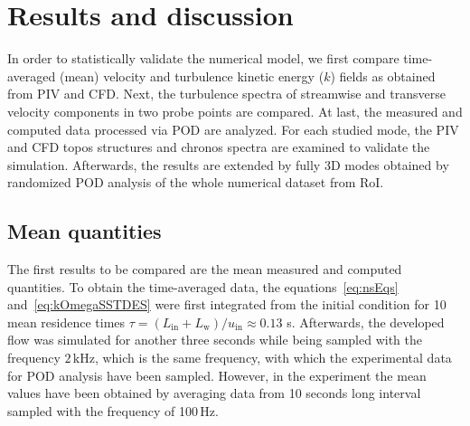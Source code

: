 \section{Results and discussion}
\label{sec:resultsAndDisc}

{In order to statistically validate the numerical model, we first compare time-averaged (mean) velocity and turbulence kinetic energy ($k$) fields as obtained from PIV and CFD.} Next, the turbulence spectra of streamwise and {transverse} velocity components in two probe points are compared. At last, the measured and computed data {processed via POD} are analyzed. For each studied mode, the PIV and CFD topos structures and chronos spectra are examined to validate the simulation. {Afterwards, } the results are extended by fully 3D modes obtained by {randomized} POD analysis of the whole numerical dataset from RoI.

\subsection{Mean quantities}
\label{sub:meanData}

The first results to be compared are the mean measured and computed quantities. To obtain the time-averaged data, the equations~\eqref{eq:nsEqs} and~\eqref{eq:kOmegaSSTDES} were first integrated from the initial condition for 10 mean residence times $\tau = (L_{\mathrm{in}} + L_{\mathrm{w}})/u_{\mathrm{in}} \approx {0.13}$ s. Afterwards, the developed flow was simulated for another three seconds while being sampled with the frequency $2\,\mathrm{kHz}$, which is the same frequency, with which the experimental data for POD analysis {have} been sampled. However, in the experiment the mean values {have} been obtained by averaging data from 10 seconds long interval sampled with {the} frequency {of} 100\,Hz.

